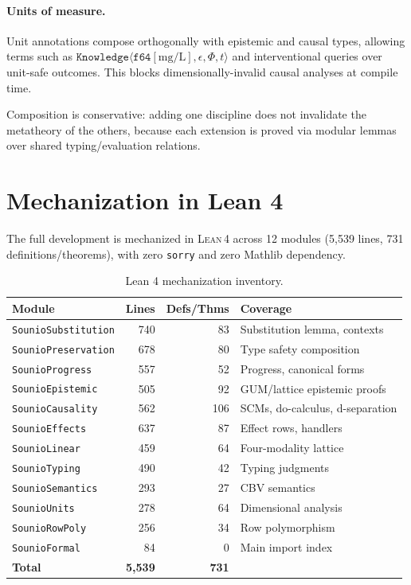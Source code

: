 \documentclass[acmsmall,screen,review,anonymous]{acmart}
\newcommand{\knowfull}[4]{\texttt{Knowledge}\langle #1, #2, #3, #4 \rangle}
\newcommand{\eps}{\epsilon}
\newcommand{\lean}{\textsc{Lean\,4}\xspace}
\begin{document}
\paragraph{Units of measure.}
Unit annotations compose orthogonally with epistemic and causal types,
allowing terms such as
$\knowfull{\texttt{f64}[\mathrm{mg/L}]}{\eps}{\Phi}{t}$ and
interventional queries over unit-safe outcomes.
This blocks dimensionally-invalid causal analyses at compile time.

Composition is conservative: adding one discipline does not invalidate
the metatheory of the others, because each extension is proved via
modular lemmas over shared typing/evaluation relations.

\section{Mechanization in Lean 4}
\label{sec:mechanization}

The full development is mechanized in \lean across 12 modules
(5{,}539 lines, 731 definitions/theorems), with zero
\texttt{sorry} and zero Mathlib dependency.

\begin{table}[t]
\centering
\caption{Lean 4 mechanization inventory.}
\label{tab:lean-inventory}
\begin{tabular}{lrrl}
\toprule
Module & Lines & Defs/Thms & Coverage \\
\midrule
\texttt{SounioSubstitution} & 740 & 83 & Substitution lemma, contexts \\
\texttt{SounioPreservation} & 678 & 80 & Type safety composition \\
\texttt{SounioProgress}     & 557 & 52 & Progress, canonical forms \\
\texttt{SounioEpistemic}    & 505 & 92 & GUM/lattice epistemic proofs \\
\texttt{SounioCausality}    & 562 & 106 & SCMs, do-calculus, d-separation \\
\texttt{SounioEffects}      & 637 & 87 & Effect rows, handlers \\
\texttt{SounioLinear}       & 459 & 64 & Four-modality lattice \\
\texttt{SounioTyping}       & 490 & 42 & Typing judgments \\
\texttt{SounioSemantics}    & 293 & 27 & CBV semantics \\
\texttt{SounioUnits}        & 278 & 64 & Dimensional analysis \\
\texttt{SounioRowPoly}      & 256 & 34 & Row polymorphism \\
\texttt{SounioFormal}       & 84  & 0  & Main import index \\
\midrule
\textbf{Total}              & \textbf{5{,}539} & \textbf{731} & \\
\bottomrule
\end{tabular}
\end{table}
\end{document}

